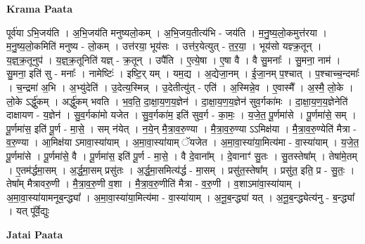 \documentclass[17pt]{extarticle}
\begin{document}
\textbf{Krama Paata} \newline

पूर्व॑या ऽभि॒जय॑ति । अ॒भि॒जय॑ति मनुष्यलो॒कम् । अ॒भि॒जय॒तीत्य॑भि - जय॑ति । म॒नु॒ष्य॒लो॒कमुत्त॑रया । म॒नु॒ष्य॒लो॒कमिति॑ मनुष्य - लो॒कम् । उत्त॑रया॒ भूय॑सः । उत्त॑र॒येत्युत् - त॒र॒या॒ । भूय॑सो यज्ञ्क्र॒तून् । य॒ज्ञ्॒क्र॒तूनुप॑ । य॒ज्ञ्॒क्र॒तूनिति॑ यज्ञ् - क्र॒तून् । उपै॑ति । ए॒त्ये॒षा । ए॒षा वै । वै सु॒मनाः᳚ । सु॒मना॒ नाम॑ । सु॒मना॒ इति॑ सु - मनाः᳚ । नामेष्टिः॑ । इष्टि॒र् यम् । यम॒द्य । अ॒द्येजा॒नम् । ई॒जा॒नम् प॒श्चात् । प॒श्चाच्च॒न्दमाः᳚ । च॒न्द्रमा॑ अ॒भि । अ॒भ्यु॑देति॑ । उ॒देत्य॒स्मिन्न् । उ॒देतीत्यु॑त् - एति॑ । अ॒स्मिन्ने॒व । ए॒वास्मै᳚ । अ॒स्मै॒ लो॒के । लो॒के ऽर्द्धु॑कम् । अर्द्धु॑कम् भवति । भ॒व॒ति॒ दा॒क्षा॒य॒ण॒य॒ज्ञेन॑ । दा॒क्षा॒य॒ण॒य॒ज्ञेन॑ सुव॒र्गका॑मः । दा॒क्षा॒य॒ण॒य॒ज्ञेनेति॑ दाक्षायण - य॒ज्ञेन॑ । सु॒व॒र्गका॑मो यजेत । सु॒व॒र्गका॑म॒ इति॑ सुव॒र्ग - का॒मः॒ । य॒जे॒त॒ पू॒र्णमा॑से । पू॒र्णमा॑से॒ सम् । पू॒र्णमा॑स॒ इति॑ पू॒र्ण - मा॒से॒ । सम् न॑येत् । न॒ये॒न् मै॒त्रा॒व॒रु॒ण्या । मै॒त्रा॒व॒रु॒ण्या ऽऽमिक्ष॑या । मै॒त्रा॒व॒रु॒ण्येति॑ मैत्रा - व॒रु॒ण्या । आ॒मिक्ष॑या ऽमावा॒स्या॑याम् । अ॒मा॒वा॒स्या॑याम् ॅयजेत । अ॒मा॒वा॒स्या॑या॒मित्य॑मा - वा॒स्या॑याम् । य॒जे॒त॒ पू॒र्णमा॑से । पू॒र्णमा॑से॒ वै । पू॒र्णमा॑स॒ इति॑ पू॒र्ण - मा॒से॒ । वै दे॒वाना᳚म् । दे॒वानाꣳ॑ सु॒तः । सु॒तस्तेषा᳚म् । तेषा॑मे॒तम् । ए॒तम॑र्द्धमा॒सम् । अ॒र्द्ध॒मा॒सम् प्रसु॑तः । अ॒र्द्ध॒मा॒समित्य॑र्द्ध - मा॒सम् । प्रसु॑त॒स्तेषा᳚म् । प्रसु॑त॒ इति॒ प्र - सु॒तः॒ । तेषा᳚म् मैत्रावरु॒णी । मै॒त्रा॒व॒रु॒णी व॒शा । मै॒त्रा॒व॒रु॒णीति॑ मैत्रा - व॒रु॒णी । व॒शाऽमा॑वा॒स्या॑याम् । अ॒मा॒वा॒स्या॑यामनूब॒न्द्ध्या᳚ । अ॒मा॒वा॒स्या॑या॒मित्य॑मा - वा॒स्या॑याम् । अ॒नू॒ब॒न्द्ध्या॑ यत् । अ॒नू॒ब॒न्द्ध्येत्य॑नु - ब॒न्द्ध्या᳚ । यत् पू᳚र्वे॒द्युः \newline

\textbf{Jatai Paata} \newline
\end{document}
